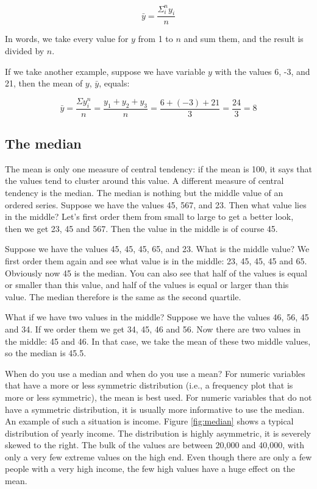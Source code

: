\documentclass[]{book}\usepackage[]{graphicx}\usepackage[]{color}
\begin{document}
\begin{equation}
\bar{y} = \frac{\Sigma_i^n y_i}{n}
\end{equation}

In words, we take every value for $y$ from 1 to $n$ and sum them, and the result is divided by $n$.

If we take another example, suppose we have variable $y$ with the values {6, -3, and 21}, then the mean of $y$, $\bar{y}$, equals:

\begin{equation}
\bar{y} = \frac {  \Sigma y_i^n} {n} =    \frac{y_1 + y_2 + y_3}{n} = \frac{6 + (-3) + 21}{3} = \frac{24}{3} = 8
\end{equation}







\subsection{The median}
The mean is only one measure of central tendency: if the mean is 100, it says that the values tend to cluster around this value. A different measure of central tendency is the median. The median is nothing but the middle value of an ordered series. Suppose we have the values 45, 567, and 23. Then what value lies in the middle? Let's first order them from small to large to get a better look, then we get 23, 45 and 567. Then the value in the middle is of course 45.

Suppose we have the values 45, 45, 45, 65, and 23. What is the middle value? We first order them again and see what value is in the middle: 23, 45, 45, 45 and 65. Obviously now 45 is the median. You can also see that half of the values is equal or smaller than this value, and half of the values is equal or larger than this value. The median therefore is the same as the second quartile.

What if we have two values in the middle? Suppose we have the values 46, 56, 45 and 34. If we order them we get 34, 45, 46 and 56. Now there are two values in the middle: 45 and 46. In that case, we take the mean of these two middle values, so the median is 45.5. 

When do you use a median and when do you use a mean? For numeric variables that have a more or less symmetric distribution (i.e., a frequency plot that is more or less symmetric), the mean is best used. For numeric variables that do not have a symmetric distribution, it is usually more informative to use the median. An example of such a situation is income. Figure \ref{fig:median} shows a typical distribution of yearly income. The distribution is highly asymmetric, it is severely skewed to the right. The bulk of the values are between 20,000 and 40,000, with only a very few extreme values on the high end. Even though there are only a few people with a very high income, the few high values have a huge effect on the mean.
\end{document}
